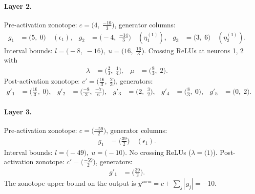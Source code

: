 \documentclass[11pt]{article}
\begin{document}
\paragraph{Layer 2.}
Pre-activation zonotope: $c = \bigl(4,\; \frac{-16}{3}\bigr)$, generator columns:
\begin{align*}
g_{1} &= \bigl(5,\; 0\bigr) \quad (\epsilon_{1}), &
g_{2} &= \bigl(-4,\; \frac{-14}{3}\bigr) \quad (\eta^{(1)}_{1}), &
g_{3} &= \bigl(3,\; 6\bigr) \quad (\eta^{(1)}_{2}).
\end{align*}
Interval bounds: $l = \bigl(-8,\; -16\bigr), \; u = \bigl(16,\; \frac{16}{3}\bigr)$. 
Crossing ReLUs at neurons 1, 2 with
\begin{align*}
\lambda &= \bigl(\frac{2}{3},\; \frac{1}{4}\bigr), & \mu &= \bigl(\frac{8}{3},\; 2\bigr).
\end{align*}
Post-activation zonotope: $c' = \bigl(\frac{16}{3},\; \frac{2}{3}\bigr)$, generators:
\begin{align*}
g'_{1} &= \bigl(\frac{10}{3},\; 0\bigr), &
g'_{2} &= \bigl(\frac{-8}{3},\; \frac{-7}{6}\bigr), &
g'_{3} &= \bigl(2,\; \frac{3}{2}\bigr), &
g'_{4} &= \bigl(\frac{8}{3},\; 0\bigr), &
g'_{5} &= \bigl(0,\; 2\bigr).
\end{align*}
\paragraph{Layer 3.}
Pre-activation zonotope: $c = \bigl(\frac{-59}{2}\bigr)$, generator columns:
\begin{align*}
g_{1} &= \bigl(\frac{39}{2}\bigr) \quad (\epsilon_{1}).
\end{align*}
Interval bounds: $l = \bigl(-49\bigr), \; u = \bigl(-10\bigr)$. 
No crossing ReLUs ($\lambda = \bigl(1\bigr)$).
Post-activation zonotope: $c' = \bigl(\frac{-59}{2}\bigr)$, generators:
\begin{align*}
g'_{1} &= \bigl(\frac{39}{2}\bigr).
\end{align*}
The zonotope upper bound on the output is $\overline{y}^{\text{zono}} = c + \sum_j |g_j| = -10$.
\end{document}
